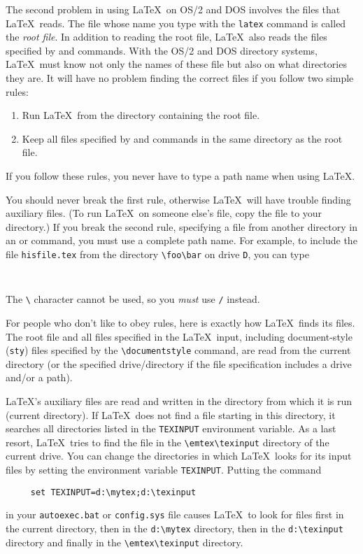 The second problem in using \LaTeX\ on OS/2 and DOS involves the files that
\LaTeX\ reads.  The file whose name you type with the {\tt latex}
command is called the {\em root file}.  In addition to reading the root
file, \LaTeX\ also reads the files specified by \hbox{\verb||}
and \hbox{\verb||} commands.  With the OS/2 and DOS directory systems,
\LaTeX\ must know not only the names of these file but also on what
directories they are.  It will have no problem finding the correct
files if you follow two simple rules:
\begin{enumerate}
 \item Run \LaTeX\ from the directory containing the root file.
 \item Keep all files specified by \hbox{\verb||} and 
      \hbox{\verb||} commands in the same directory as the root
       file.
\end{enumerate}
If you follow these rules, you never have to type a path name
when using \LaTeX.
 
You should never break the first rule, otherwise \LaTeX\ will have
trouble finding auxiliary files.  (To run \LaTeX\ on someone else's
file, copy the file to your directory.) If you break the second
rule, specifying a file from another directory in an
\hbox{\verb||} or \hbox{\verb||} command, you must use a
complete path name.  For example, to include the file \mbox{\tt hisfile.tex} 
from the directory \hbox{\verb|\foo\bar|} on drive \verb|D|, you can type
\begin{verbatim}
     
\end{verbatim}
The \verb|\| character cannot be used, so you {\em must\/}
use \verb|/| instead.
 
For people who don't like to obey rules, 
here is exactly how \LaTeX\ finds its
files.  The root file and all files specified in the \LaTeX\ input,
including document-style ({\tt sty}) files specified by the
\hbox{\verb|\documentstyle|} command,
are read from the current directory (or the specified drive/directory if
the file specification includes a drive and/or a path).

\LaTeX's auxiliary files are read and written in the directory from
which it is run (current directory).
If \LaTeX\ does not find a file starting in this directory,
it searches all directories listed in the \verb|TEXINPUT| environment
variable.  As a last resort, \LaTeX\ tries to find the file in
the \verb|\emtex\texinput| directory of the current drive.
You can change the directories in which \LaTeX\ looks for its input files
by setting the environment variable \verb|TEXINPUT|.
Putting the command
\begin{verbatim}
     set TEXINPUT=d:\mytex;d:\texinput
\end{verbatim}
in your \verb|autoexec.bat| or \verb|config.sys| file causes \LaTeX\ to
look for files first in the current directory, then in the \verb|d:\mytex|
directory, then in the \verb|d:\texinput| directory and finally in the
\verb|\emtex\texinput| directory.
 
